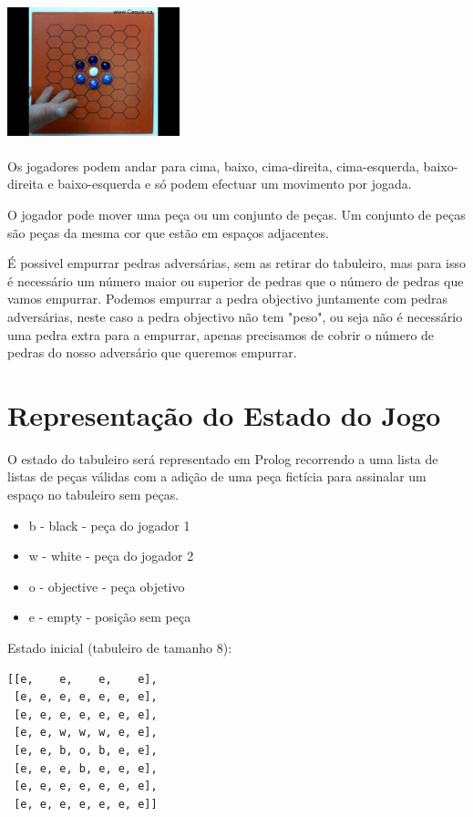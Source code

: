 \documentclass[a4paper]{article}
\begin{document}
\includegraphics[height=4cm, width=5cm]{sumo.jpg}

Os jogadores podem andar para cima, baixo, cima-direita, cima-esquerda, baixo-direita e baixo-esquerda e só podem efectuar um movimento por jogada.

O jogador pode mover uma peça ou um conjunto de peças. Um conjunto de peças são peças da mesma cor que estão em espaços adjacentes.

É possivel empurrar pedras adversárias, sem as retirar do tabuleiro, mas para isso é necessário um número maior ou superior de pedras que o número de pedras que vamos empurrar. Podemos empurrar a pedra objectivo juntamente com pedras adversárias, neste caso a pedra objectivo não tem "peso", ou seja não é necessário uma pedra extra para a empurrar, apenas precisamos de cobrir o número de pedras do nosso adversário que queremos empurrar.

\section{Representação do Estado do Jogo}
O estado do tabuleiro será representado em Prolog recorrendo a uma lista de listas de peças válidas com a adição de uma peça fictícia para assinalar um espaço no tabuleiro sem peças.

\begin{itemize}
\item b - black - peça do jogador 1
\item w - white - peça do jogador 2
\item o - objective - peça objetivo
\item e - empty - posição sem peça
\end{itemize}

Estado inicial (tabuleiro de tamanho 8):
\begin{verbatim}
[[e,    e,    e,    e],
 [e, e, e, e, e, e, e],
 [e, e, e, e, e, e, e],
 [e, e, w, w, w, e, e],
 [e, e, b, o, b, e, e],
 [e, e, e, b, e, e, e],
 [e, e, e, e, e, e, e],
 [e, e, e, e, e, e, e]]
\end{verbatim}
\end{document}
